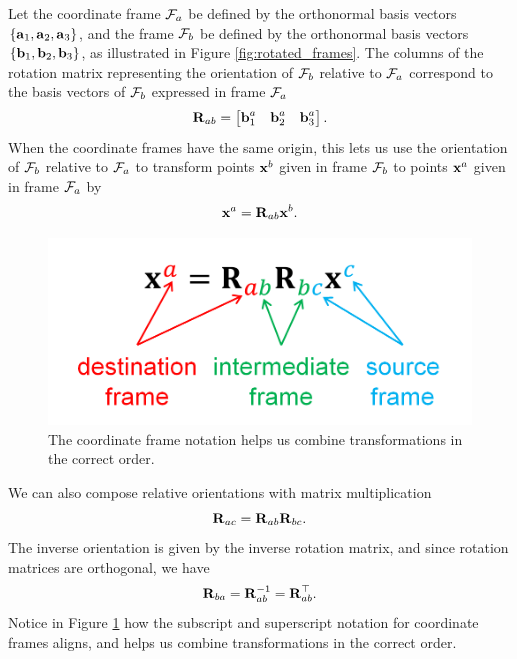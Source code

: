 Let the coordinate frame $\mathcal{F}_a$ be defined by the orthonormal basis vectors $\{{\boldsymbol{\mathbf{a}}}_1, {\boldsymbol{\mathbf{a}}}_2, {\boldsymbol{\mathbf{a}}}_3\}$, and the frame $\mathcal{F}_b$ be defined by the orthonormal basis vectors $\{{\boldsymbol{\mathbf{b}}}_1, {\boldsymbol{\mathbf{b}}}_2, {\boldsymbol{\mathbf{b}}}_3\}$, as illustrated in Figure \ref{fig:rotated_frames}.
The columns of the rotation matrix representing the orientation of $\mathcal{F}_b$ relative to $\mathcal{F}_a$ correspond to the basis vectors of $\mathcal{F}_b$ expressed in frame $\mathcal{F}_a$
\begin{equation} \label{eq:rot_basis}
  {\boldsymbol{\mathbf{R}}}_{ab} = 
  \begin{bmatrix}
    {\boldsymbol{\mathbf{b}}}^a_1 & {\boldsymbol{\mathbf{b}}}^a_2 & {\boldsymbol{\mathbf{b}}}^a_3
  \end{bmatrix}.
\end{equation}
When the coordinate frames have the same origin, this lets us use the orientation of $\mathcal{F}_b$ relative to $\mathcal{F}_a$ to transform points ${\boldsymbol{\mathbf{x}}}^b$ given in frame $\mathcal{F}_b$ to points ${\boldsymbol{\mathbf{x}}}^a$ given in frame $\mathcal{F}_a$ by
\begin{equation}
  {\boldsymbol{\mathbf{x}}}^a = {\boldsymbol{\mathbf{R}}}_{ab} {\boldsymbol{\mathbf{x}}}^b.
\end{equation}

\begin{figure}[htb]
    \centering
    \includegraphics[width=0.5\columnwidth]{figures/coordinate_frame_notation.png}
    \caption{The coordinate frame notation helps us combine transformations in the correct order.}
    \label{fig:coordinate-frame-notation}
\end{figure}

We can also compose relative orientations with matrix multiplication
\begin{equation}
  {\boldsymbol{\mathbf{R}}}_{ac} = {\boldsymbol{\mathbf{R}}}_{ab} {\boldsymbol{\mathbf{R}}}_{bc}.
\end{equation}
The inverse orientation is given by the inverse rotation matrix, and since rotation matrices are orthogonal, we have
\begin{equation}
  {\boldsymbol{\mathbf{R}}}_{ba} = {\boldsymbol{\mathbf{R}}}_{ab}^{-1} = {\boldsymbol{\mathbf{R}}}_{ab}^{\top}.
\end{equation}
Notice in Figure \ref{fig:coordinate-frame-notation} how the subscript and superscript notation for coordinate frames aligns, and helps us combine transformations in the correct order.

